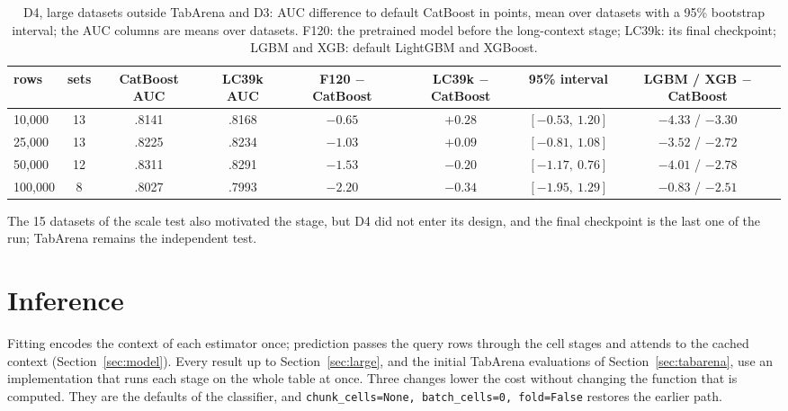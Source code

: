 \documentclass[11pt]{article}
\begin{document}
\begin{table}[t]
\centering
\footnotesize
\setlength{\tabcolsep}{3pt}
\begin{tabular}{lccccccc}
\toprule
rows & sets & CatBoost AUC & LC39k AUC & F120 $-$ CatBoost & LC39k $-$ CatBoost & 95\% interval & LGBM / XGB $-$ CatBoost \\
\midrule
10,000 & 13 & .8141 & .8168 & $-0.65$ & $+0.28$ & $[-0.53,\ 1.20]$ & $-4.33$ / $-3.30$ \\
25,000 & 13 & .8225 & .8234 & $-1.03$ & $+0.09$ & $[-0.81,\ 1.08]$ & $-3.52$ / $-2.72$ \\
50,000 & 12 & .8311 & .8291 & $-1.53$ & $-0.20$ & $[-1.17,\ 0.76]$ & $-4.01$ / $-2.78$ \\
100,000 & 8 & .8027 & .7993 & $-2.20$ & $-0.34$ & $[-1.95,\ 1.29]$ & $-0.83$ / $-2.51$ \\
\bottomrule
\end{tabular}
\caption{D4, large datasets outside TabArena and D3: AUC difference to default CatBoost in points, mean
over datasets with a 95\% bootstrap interval; the AUC columns are means over datasets. F120: the pretrained model before the
long-context stage; LC39k: its final checkpoint; LGBM and XGB: default LightGBM and XGBoost.}
\label{tab:large}
\end{table}

The 15 datasets of the scale test also motivated the stage, but D4 did not enter its design, and the final
checkpoint is the last one of the run; TabArena remains the independent test.

\section{Inference}
\label{sec:inference}

Fitting encodes the context of each estimator once; prediction passes the query rows through the cell stages and
attends to the cached context (Section~\ref{sec:model}). Every result up to Section~\ref{sec:large}, and the
initial TabArena evaluations of Section~\ref{sec:tabarena}, use an implementation that runs each stage on the whole
table at once. Three changes lower the cost without changing the function that is computed. They are the defaults
of the classifier, and \texttt{chunk\_cells=None, batch\_cells=0, fold=False} restores the earlier path.
\end{document}

